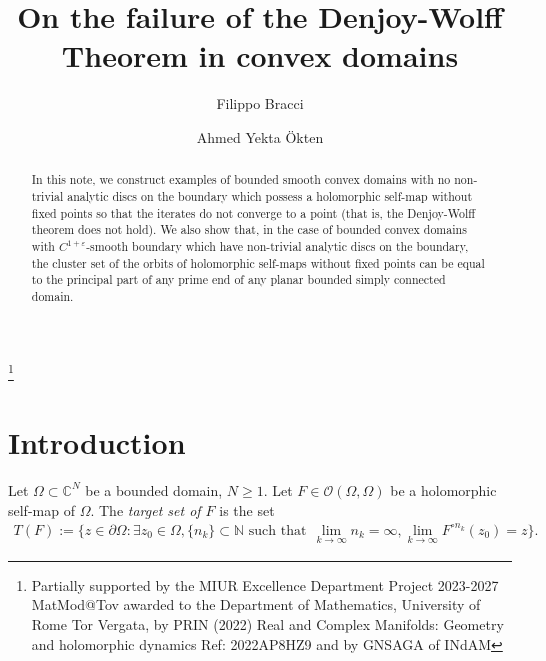 \documentclass[12pt]{amsart}
\theoremstyle{definition}
\theoremstyle{remark}
\numberwithin{equation}{section}
\def\C{\mathbb C}
\begin{document}
	
	\title[Failure of the Denjoy-Wolff Theorem]
	{On the failure of the Denjoy-Wolff Theorem in convex domains}
	
	
	\author{Filippo Bracci}
	\author{Ahmed Yekta \"Okten}  
	
	\address{F.Bracci, A. Y. \"Okten:  Dipartimento di Matematica, Universit\`a Di Roma ``Tor Vergata''��, Via Della Ricerca Scientifica 1, 00133 Roma, Italy}
	
	

	

	\thanks{Partially supported by the MIUR Excellence Department Project 2023-2027 MatMod@Tov awarded to the Department of Mathematics, University of Rome Tor Vergata, by PRIN (2022) Real and Complex Manifolds: Geometry and holomorphic dynamics Ref: 2022AP8HZ9 and by GNSAGA of INdAM}
	
	

	
	\begin{abstract}  
In this note, we construct examples of bounded smooth convex domains with no non-trivial analytic discs on the boundary which possess a holomorphic self-map without fixed points so that the iterates do not converge to a point (that is, the Denjoy-Wolff theorem does not hold). We also show that, in the case of bounded convex domains with $C^{1+\varepsilon}$-smooth boundary which have non-trivial analytic discs on the boundary, the cluster set of the orbits of holomorphic self-maps without fixed points can be equal to the principal part of any prime end of any planar bounded simply connected domain.		
 \end{abstract}
	

	
	
	\maketitle

\section{Introduction}


Let $\Omega\subset \C^N$ be a bounded domain, $N\geq 1$. Let $F\in \mathcal{O}(\Omega,\Omega)$ be a holomorphic self-map of $\Omega$. The {\sl target set of $F$} is the set 
\begin{equation*}
\begin{split}
T(F):=\{z\in \partial{\Omega}: \exists z_0 \in \Omega,  \{n_k\}\subset \mathbb N \text{\ such that} \:\: \lim_{k\to \infty}n_k=\infty, \lim_{k\to\infty}F^{\circ n_k}(z_0)= z\}.
\end{split}
\end{equation*}
\end{document}

